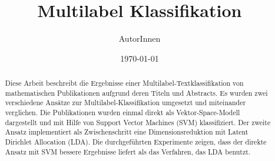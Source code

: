 \documentclass{scrartcl}
\title{Multilabel Klassifikation}
\author{AutorInnen}
\date{\today}
\begin{document}
\maketitle

\begin{abstract}
    Diese Arbeit beschreibt die Ergebnisse einer Multilabel-Textklassifikation von mathematischen Publikationen aufgrund deren Titeln und Abstracts.
    Es wurden zwei verschiedene Ansätze zur Multilabel-Klassifikation umgesetzt und miteinander verglichen.
    Die Publikationen wurden einmal direkt als Vektor-Space-Modell dargestellt und mit Hilfe von Support Vector Machines (SVM) klassifiziert.
    Der zweite Ansatz implementiert als Zwischenschritt eine Dimensionsreduktion mit Latent Dirichlet Allocation (LDA).
    Die durchgeführten Experimente zeigen, dass der direkte Ansatz mit SVM bessere Ergebnisse liefert als das Verfahren, das LDA benutzt.
\end{abstract}

\tableofcontents
\newpage









\nocite{*}
\newpage


\end{document}
